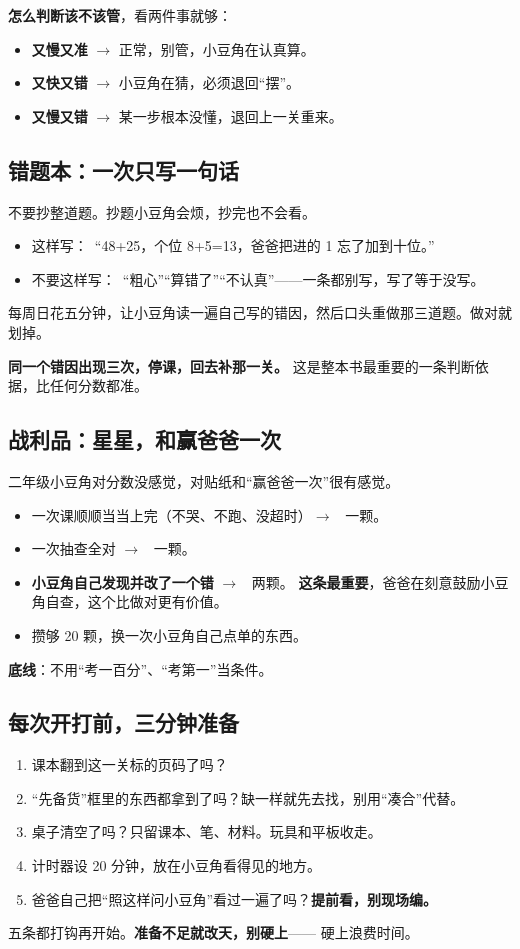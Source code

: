 \noindent \textbf{怎么判断该不该管}，看两件事就够：

\begin{itemize}
  \item \textbf{又慢又准} $\to$ 正常，别管，小豆角在认真算。
  \item \textbf{又快又错} $\to$ 小豆角在猜，必须退回“摆”。
  \item \textbf{又慢又错} $\to$ 某一步根本没懂，退回上一关重来。
\end{itemize}

\subsection{错题本：一次只写一句话}

不要抄整道题。抄题小豆角会烦，抄完也不会看。

\begin{itemize}
  \item 这样写：\ “48+25，个位 8+5=13，爸爸把进的 1 忘了加到十位。”
  \item 不要这样写：\ “粗心”“算错了”“不认真”——一条都别写，写了等于没写。
\end{itemize}

\noindent 每周日花五分钟，让小豆角读一遍自己写的错因，然后口头重做那三道题。做对就划掉。

\textbf{同一个错因出现三次，停课，回去补那一关。}
这是整本书最重要的一条判断依据，比任何分数都准。

\subsection{战利品：星星，和赢爸爸一次}

二年级小豆角对分数没感觉，对贴纸和“赢爸爸一次”很有感觉。

\begin{itemize}
  \item 一次课顺顺当当上完（不哭、不跑、没超时）$\to$ \starx\ 一颗。
  \item 一次抽查全对 $\to$ \starx\ 一颗。
  \item \textbf{小豆角自己发现并改了一个错} $\to$ \starx\starx\ 两颗。
        \textbf{这条最重要}，爸爸在刻意鼓励小豆角自查，这个比做对更有价值。
  \item 攒够 20 颗，换一次小豆角自己点单的东西。
\end{itemize}

\noindent \textbf{底线}：不用“考一百分”、“考第一”当条件。

\subsection{每次开打前，三分钟准备}

\begin{enumerate}
  \item \cb 课本翻到这一关标的页码了吗？
  \item \cb “先备货”框里的东西都拿到了吗？缺一样就先去找，别用“凑合”代替。
  \item \cb 桌子清空了吗？只留课本、笔、材料。玩具和平板收走。
  \item \cb 计时器设 20 分钟，放在小豆角看得见的地方。
  \item \cb 爸爸自己把“照这样问小豆角”看过一遍了吗？\textbf{提前看，别现场编。}
\end{enumerate}

\noindent 五条都打钩再开始。\textbf{准备不足就改天，别硬上}——
硬上浪费时间。
